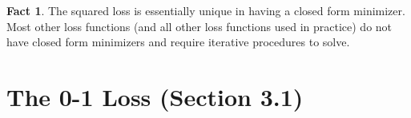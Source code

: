 \documentclass[10pt]{exam}
\theoremstyle{definition}
\newtheorem{problem}{Problem}
\newtheorem{note}{Note}
\newtheorem{fact}{Fact}
\newcommand{\x}{\mathbf x}
\begin{document}


\newpage
\begin{fact}
The squared loss is essentially unique in having a closed form minimizer.
Most other loss functions (and all other loss functions used in practice) do not have closed form minimizers and require iterative procedures to solve.
\end{fact}

\section*{The 0-1 Loss (Section 3.1)}
\end{document}
